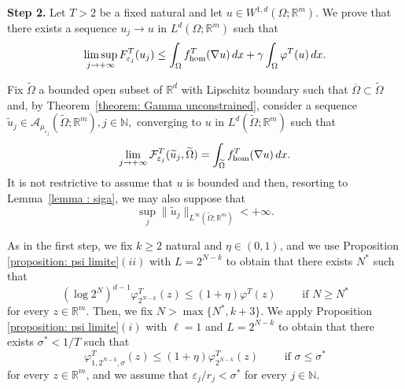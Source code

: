 \documentclass{article}
\theoremstyle{plain}
\theoremstyle{definition}
\def\rr{{\mathbb R}}
\def\NN{{\mathbb N}}
\newcommand{\f}{\varphi}
\newcommand{\ej}{\varepsilon_j}
\newcommand{\rj}{r_j}
\newcommand{\s}{\sigma}
\newcommand{\A}{\mathcal{A}}
\newcommand{\F}{\mathcal{F}}
\numberwithin{equation}{section}
\begin{document}
\smallskip

{\bf Step 2.} Let $T>2$ be a fixed natural and let $u\in W^{1,d}(\Omega;\rr^m)$. We prove that there exists a sequence $u_j\to u$ in $L^d(\Omega; \rr^m)$ such that
\begin{equation}\label{claim limsup T}
     \limsup_{j\to+\infty} F^T_{\ej}(u_j)\leq \int_\Omega f^T_{\rm hom}(\nabla u)\,dx+\gamma\int_\Omega\f^T(u)\, dx.
\end{equation}

Fix $\widetilde{\Omega}$ a bounded open subset of $\rr^d$ with Lipschitz boundary such that $\overline{\Omega}\subset\widetilde{\Omega}$ and, by Theorem~\ref{theorem: Gamma unconstrained}, consider a sequence $\widetilde{u}_j\in \A_{\mu_{\ej}}(\widetilde{\Omega};\rr^m),j\in\NN,$ converging to $u$ in $L^d(\widetilde{\Omega};\rr^m)$ such that
\begin{equation}\label{recovery unconstrained}
    \lim_{j\to+\infty}\F^T_{\ej}(\widetilde{u}_j, \widetilde{\Omega})= \int_{\widetilde{\Omega}}f^T_{\rm hom}(\nabla u)\,dx.
\end{equation}
It is not restrictive to assume that $u$ is bounded and then, resorting to Lemma~\ref{lemma : siga}, we may also suppose that 
\begin{equation}\label{bound infty recovery}
\sup_j\|\widetilde{u}_j\|_{L^\infty(\widetilde{\Omega};\rr^m)}<+\infty.
\end{equation}

As in the first step, we fix $k\geq2$ natural and $\eta\in(0,1)$, and we use Proposition \ref{proposition: psi limite}$(ii)$ with $L=2^{N-k}$ to obtain that there exists $N^*$ such that
\begin{equation}\label{scelta N limsup}
   (\log 2^N)^{d-1}\f^T_{2^{N-k}}(z)\leq(1+\eta)\f^T(z) \qquad \text{ if } N\geq N^*
\end{equation}
for every $z\in \rr^m$. Then, we fix $N>\max\{N^*,k+3\}$. We apply  Proposition \ref{proposition: psi limite}$(i)$ with $\ell=1$ and $L=2^{N-k}$ to obtain that there exists $\s^*< 1/T$ such that
\begin{equation}\label{scelta j limsup}
    \f^T_{1,2^{N-k},\s}(z)\leq (1+\eta)\f^T_{2^{N-k}}(z) \qquad \text{ if } \s\leq \s^*
\end{equation}
for every $z\in \rr^m$, and we assume that $\ej/\rj<\s^*$ for every $j\in\NN$.
\end{document}
